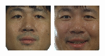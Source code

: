 \begin{figure}
\begin{center}
{\includegraphics[width=\columnwidth/12]{ch5/figures/00029_941031_fb.png}
\includegraphics[width=\columnwidth/12]{ch5/figures/00029_960530_fb.png}
}
\end{center}
\end{figure}
